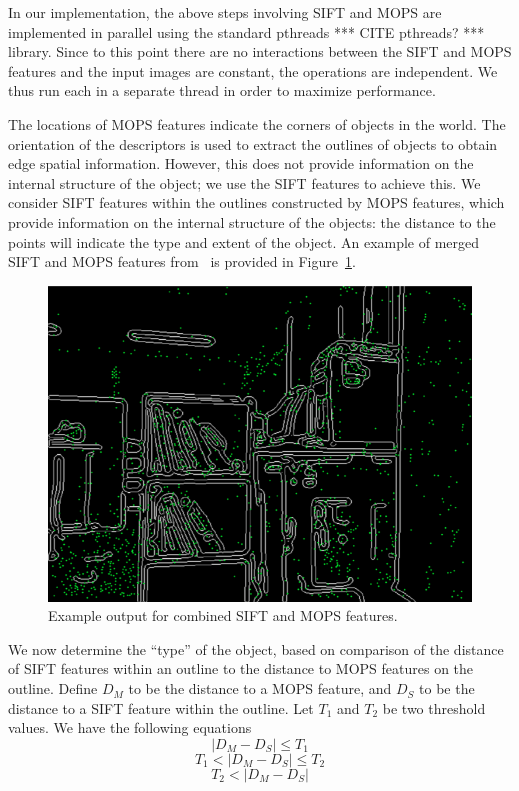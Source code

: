 \documentclass{acmsiggraph}
\begin{document}
In our implementation, the above steps involving SIFT and MOPS are implemented in parallel using the standard pthreads *** CITE pthreads? *** library. Since to this point there are no interactions between the SIFT and MOPS features and the input images are constant, the operations are independent. We thus run each in a separate thread in order to maximize performance.

The locations of MOPS features indicate the corners of objects in the world. The orientation of the descriptors is used to extract the outlines of objects to obtain edge spatial information. However, this does not provide information on the internal structure of the object; we use the SIFT features to achieve this. We consider SIFT features within the outlines constructed by MOPS features, which provide information on the internal structure of the objects: the distance to the points will indicate the type and extent of the object. An example of merged SIFT and MOPS features from~\cite{lee2011} is provided in Figure~\ref{fig:lee-sift-mops}.

\begin{figure}[h]
  \centering
  \includegraphics[resolution=150, scale=0.5]{images/lee-sift-mops-example}
  \caption{Example output for combined SIFT and MOPS features.}
  \label{fig:lee-sift-mops}
\end{figure}

We now determine the ``type'' of the object, based on comparison of the distance of SIFT features within an outline to the distance to MOPS features on the outline. Define $D_M$ to be the distance to a MOPS feature, and $D_S$ to be the distance to a SIFT feature within the outline. Let $T_1$ and $T_2$ be two threshold values. We have the following equations
\begin{equation}
  \label{eq:dist1}
  | D_M - D_S | \leq T_1
\end{equation}
\begin{equation}
  \label{eq:dist2}
  T_1 < | D_M - D_S | \leq T_2
\end{equation}
\begin{equation}
  \label{eq:dist3}
  T_2 < | D_M - D_S |
\end{equation}
\end{document}
